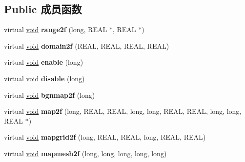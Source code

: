 \subsection*{Public 成员函数}
\begin{DoxyCompactItemize}
\item 
\mbox{\label{class_basic_surface_evaluator_a8ef8caceea6a3d79b1ccb9b46b6da0f1}} 
virtual \hyperlink{interfacevoid}{void} {\bfseries range2f} (long, R\+E\+AL $\ast$, R\+E\+AL $\ast$)
\item 
\mbox{\label{class_basic_surface_evaluator_abdbd93941266d06445e2781dde883479}} 
virtual \hyperlink{interfacevoid}{void} {\bfseries domain2f} (R\+E\+AL, R\+E\+AL, R\+E\+AL, R\+E\+AL)
\item 
\mbox{\label{class_basic_surface_evaluator_aee837a341b5615ee61fe572e8d55b9ac}} 
virtual \hyperlink{interfacevoid}{void} {\bfseries enable} (long)
\item 
\mbox{\label{class_basic_surface_evaluator_a0a664032c313e0bff2f00295e7f17ad6}} 
virtual \hyperlink{interfacevoid}{void} {\bfseries disable} (long)
\item 
\mbox{\label{class_basic_surface_evaluator_a0fd37925bd343fe9aecbc0ee5457f51c}} 
virtual \hyperlink{interfacevoid}{void} {\bfseries bgnmap2f} (long)
\item 
\mbox{\label{class_basic_surface_evaluator_a36ef31c81b7ae490f40d17bee79481fc}} 
virtual \hyperlink{interfacevoid}{void} {\bfseries map2f} (long, R\+E\+AL, R\+E\+AL, long, long, R\+E\+AL, R\+E\+AL, long, long, R\+E\+AL $\ast$)
\item 
\mbox{\label{class_basic_surface_evaluator_ab1a894bea3ed1d1112c29c2c8e955f58}} 
virtual \hyperlink{interfacevoid}{void} {\bfseries mapgrid2f} (long, R\+E\+AL, R\+E\+AL, long, R\+E\+AL, R\+E\+AL)
\item 
\mbox{\label{class_basic_surface_evaluator_a56cb9e1bca9a3acc1512f7f691f041f6}} 
virtual \hyperlink{interfacevoid}{void} {\bfseries mapmesh2f} (long, long, long, long, long)

\end{DoxyCompactItemize}
